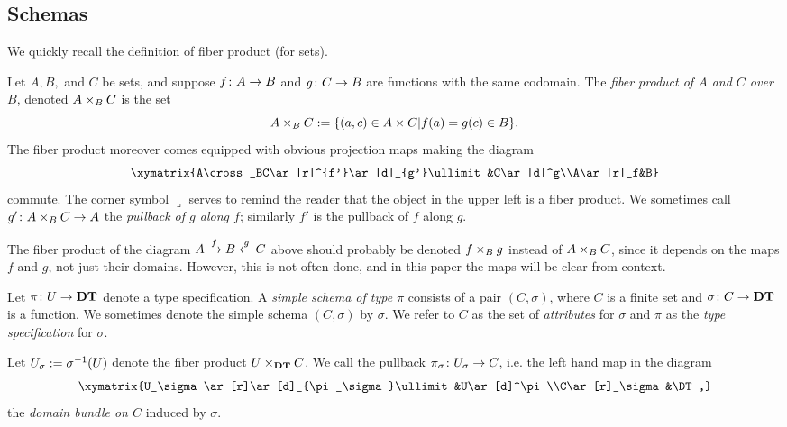 \documentclass{amsart}
\begin{document}
\subsection{Schemas}

We quickly recall the definition of fiber product (for sets).

\begin{definition}

Let $A, B,$ and $C$ be sets, and suppose $f\colon A\rightarrow B$ and $g\colon C\rightarrow B$ are functions with the same codomain.  The {\em fiber product of $A$ and $C$ over $B$}, denoted $A\times_BC$ is the set $$A\times_BC:=\{(a,c)\in A\times C | f(a)=g(c)\in B\}.$$  The fiber product moreover comes equipped with obvious projection maps making the diagram $$\xymatrix{A\cross_BC\ar[r]^{f'}\ar[d]_{g'}\ullimit&C\ar[d]^g\\A\ar[r]_f&B}$$ commute.  The corner symbol $\lrcorner$ serves to remind the reader that the object in the upper left is a fiber product.   We sometimes call $g'\colon A\times_BC\rightarrow A$ the {\em pullback of $g$ along $f$}; similarly $f'$ is the pullback of $f$ along $g$.

\end{definition}

\begin{remark}

The fiber product of the diagram $A\xrightarrow{f}B\xleftarrow{g}C$ above should probably be denoted $f\times_Bg$ instead of $A\times_BC$, since it depends on the maps $f$ and $g$, not just their domains.  However, this is not often done, and in this paper the maps will be clear from context.

\end{remark}

\begin{definition}\label{def:simple schema}

Let $\pi\colon U\rightarrow{\bf DT}$ denote a type specification.  A {\em simple schema of type $\pi$} consists of a pair $(C,\sigma)$, where $C$ is a finite set and $\sigma\colon C\rightarrow{\bf DT}$ is a function.   We sometimes denote the simple schema $(C,\sigma)$ by $\sigma$.  We refer to $C$ as the set of {\em attributes} for $\sigma$ and $\pi$ as the {\em type specification} for $\sigma$.

Let $U_\sigma:=\sigma^\m1(U)$ denote the fiber product $U\times_{\bf DT} C$.  We call the pullback $\pi_\sigma\colon U_\sigma\rightarrow C$, i.e. the left hand map in the diagram $$\xymatrix{U_\sigma\ar[r]\ar[d]_{\pi_\sigma}\ullimit&U\ar[d]^\pi\\C\ar[r]_\sigma&\DT,}$$ the {\em domain bundle on $C$} induced by $\sigma$.

\end{definition}
\end{document}
